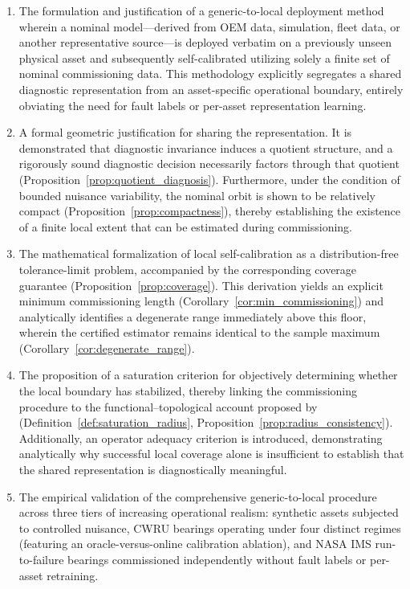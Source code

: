 \documentclass[a4paper]{cas-sc}
\begin{document}
\begin{enumerate}

\item The formulation and justification of a generic-to-local deployment method wherein a nominal model---derived from OEM data, simulation, fleet data, or another representative source---is deployed verbatim on a previously unseen physical asset and subsequently self-calibrated utilizing solely a finite set of nominal commissioning data. This methodology explicitly segregates a shared diagnostic representation from an asset-specific operational boundary, entirely obviating the need for fault labels or per-asset representation learning.

\item A formal geometric justification for sharing the representation. It is demonstrated that diagnostic invariance induces a quotient structure, and a rigorously sound diagnostic decision necessarily factors through that quotient (Proposition~\ref{prop:quotient_diagnosis}). Furthermore, under the condition of bounded nuisance variability, the nominal orbit is shown to be relatively compact (Proposition~\ref{prop:compactness}), thereby establishing the existence of a finite local extent that can be estimated during commissioning.

\item The mathematical formalization of local self-calibration as a distribution-free tolerance-limit problem, accompanied by the corresponding coverage guarantee (Proposition~\ref{prop:coverage}). This derivation yields an explicit minimum commissioning length (Corollary~\ref{cor:min_commissioning}) and analytically identifies a degenerate range immediately above this floor, wherein the certified estimator remains identical to the sample maximum (Corollary~\ref{cor:degenerate_range}).

\item The proposition of a saturation criterion for objectively determining whether the local boundary has stabilized, thereby linking the commissioning procedure to the functional--topological account proposed by~\citet{disanti2026blueprints} (Definition~\ref{def:saturation_radius}, Proposition~\ref{prop:radius_consistency}). Additionally, an operator adequacy criterion is introduced, demonstrating analytically why successful local coverage alone is insufficient to establish that the shared representation is diagnostically meaningful.

\item The empirical validation of the comprehensive generic-to-local procedure across three tiers of increasing operational realism: synthetic assets subjected to controlled nuisance, CWRU bearings operating under four distinct regimes (featuring an oracle-versus-online calibration ablation), and NASA IMS run-to-failure bearings commissioned independently without fault labels or per-asset retraining.

\end{enumerate}
\end{document}
